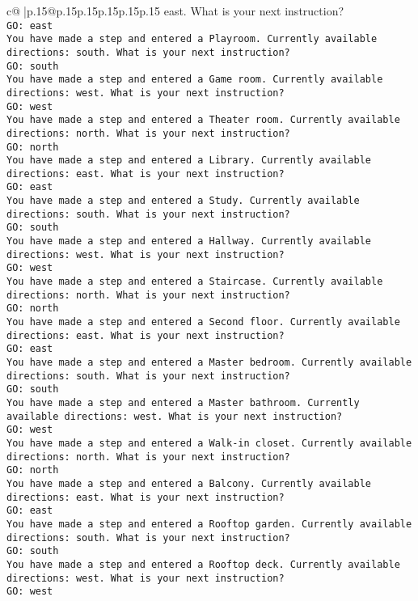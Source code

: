 \documentclass{article}
\begin{document}
{\begin{supertabular}{c@{$\;$}|p{.15\linewidth}@{}p{.15\linewidth}p{.15\linewidth}p{.15\linewidth}p{.15\linewidth}p{.15\linewidth}}
{{{east. What is your next instruction?\\ \tt GO: east\\ \tt You have made a step and entered a Playroom. Currently available directions: south. What is your next instruction?\\ \tt GO: south\\ \tt You have made a step and entered a Game room. Currently available directions: west. What is your next instruction?\\ \tt GO: west\\ \tt You have made a step and entered a Theater room. Currently available directions: north. What is your next instruction?\\ \tt GO: north\\ \tt You have made a step and entered a Library. Currently available directions: east. What is your next instruction?\\ \tt GO: east\\ \tt You have made a step and entered a Study. Currently available directions: south. What is your next instruction?\\ \tt GO: south\\ \tt You have made a step and entered a Hallway. Currently available directions: west. What is your next instruction?\\ \tt GO: west\\ \tt You have made a step and entered a Staircase. Currently available directions: north. What is your next instruction?\\ \tt GO: north\\ \tt You have made a step and entered a Second floor. Currently available directions: east. What is your next instruction?\\ \tt GO: east\\ \tt You have made a step and entered a Master bedroom. Currently available directions: south. What is your next instruction?\\ \tt GO: south\\ \tt You have made a step and entered a Master bathroom. Currently available directions: west. What is your next instruction?\\ \tt GO: west\\ \tt You have made a step and entered a Walk-in closet. Currently available directions: north. What is your next instruction?\\ \tt GO: north\\ \tt You have made a step and entered a Balcony. Currently available directions: east. What is your next instruction?\\ \tt GO: east\\ \tt You have made a step and entered a Rooftop garden. Currently available directions: south. What is your next instruction?\\ \tt GO: south\\ \tt You have made a step and entered a Rooftop deck. Currently available directions: west. What is your next instruction?\\ \tt GO: west\\ \tt }}}
\end{supertabular}}
\end{document}
